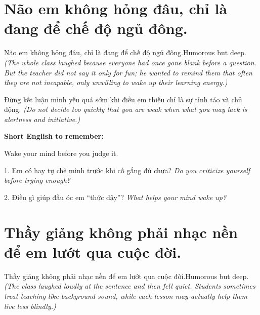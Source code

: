 \section{Não em không hỏng đâu, chỉ là đang để chế độ ngủ đông.}
\begin{truyen}{Não em không hỏng đâu, chỉ là đang để chế độ ngủ đông.}{Humorous but deep.}
\textit{(The whole class laughed because everyone had once gone blank before a question. But the teacher did not say it only for fun; he wanted to remind them that often they are not incapable, only unwilling to wake up their learning energy.)}
\end{truyen}

\begin{baihoc}
Đừng kết luận mình yếu quá sớm khi điều em thiếu chỉ là sự tỉnh táo và chủ động.
\textit{(Do not decide too quickly that you are weak when what you may lack is alertness and initiative.)}
\end{baihoc}

\begin{ghinhoanh}
\textbf{Short English to remember:}

Wake your mind before you judge it.

\end{ghinhoanh}

\begin{tuhocnhanh}
1. Em có hay tự chê mình trước khi cố gắng đủ chưa? \textit{Do you criticize yourself before trying enough?}

2. Điều gì giúp đầu óc em “thức dậy”? \textit{What helps your mind wake up?}
\end{tuhocnhanh}
\ngancach

\section{Thầy giảng không phải nhạc nền để em lướt qua cuộc đời.}
\begin{truyen}{Thầy giảng không phải nhạc nền để em lướt qua cuộc đời.}{Humorous but deep.}
\textit{(The class laughed loudly at the sentence and then fell quiet. Students sometimes treat teaching like background sound, while each lesson may actually help them live less blindly.)}
\end{truyen}

